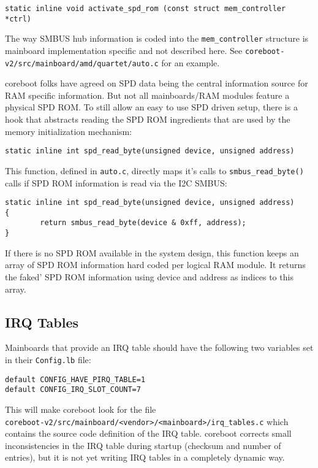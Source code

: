 \documentclass[titlepage,12pt]{article}
\begin{document}
\begin{verbatim}
static inline void activate_spd_rom (const struct mem_controller *ctrl)
\end{verbatim}

The way SMBUS hub information is coded into the \texttt{mem\_controller}
structure is mainboard implementation specific and not
described here.  See \texttt{coreboot-v2/src/mainboard/amd/quartet/auto.c}
for an example.

coreboot folks have agreed on SPD data being the central information
source for RAM specific information. But not all mainboards/RAM
modules feature a physical SPD ROM. To still allow an easy to use SPD
driven setup, there is a hook that abstracts reading the SPD ROM
ingredients that are used by the memory initialization mechanism:

\begin{verbatim}
static inline int spd_read_byte(unsigned device, unsigned address)
\end{verbatim}

This function, defined in \texttt{auto.c}, directly maps it's calls to
\texttt{smbus\_read\_byte()} calls if SPD ROM information is read via
the I2C SMBUS:

\begin{verbatim}
static inline int spd_read_byte(unsigned device, unsigned address)
{
        return smbus_read_byte(device & 0xff, address);
}
\end{verbatim}

If there is no SPD ROM available in the system design, this function
keeps an array of SPD ROM information hard coded per logical RAM module.
It returns the faked' SPD ROM information using device and address
as indices to this array.


\subsection {IRQ Tables}

Mainboards that provide an IRQ table should have the following two
variables set in their \texttt{Config.lb} file:

\begin{verbatim}
default CONFIG_HAVE_PIRQ_TABLE=1
default CONFIG_IRQ_SLOT_COUNT=7
\end{verbatim}

This will make coreboot look for the file \\
\texttt{coreboot-v2/src/mainboard/<vendor>/<mainboard>/irq\_tables.c} which
contains the source code definition of the IRQ table. coreboot corrects
small inconsistencies in the IRQ table during startup (checksum and
number of entries), but it is not yet writing IRQ tables in a completely 
dynamic way.
\end{document}
